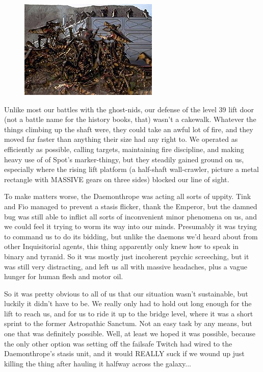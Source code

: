 \begin{figure}
	\begin{center}
		\includegraphics[width=\figwidth]{pics/15/65.png}
	\end{center}
\end{figure}
Unlike most our battles with the ghost-nids, our defense of the level 39 lift door (not a battle name for the history books, that) wasn't a cakewalk. 
Whatever the things climbing up the shaft were, they could take an awful lot of fire, and they moved far faster than anything their size had any right to. 
We operated as efficiently as possible, calling targets, maintaining fire discipline, and making heavy use of of Spot's marker-thingy, but they steadily gained ground on us, especially where the rising lift platform (a half-shaft wall-crawler, picture a metal rectangle with MASSIVE gears on three sides) blocked our line of sight.

To make matters worse, the Daemonthrope was acting all sorts of uppity. 
Tink and Fio managed to prevent a stasis flicker, thank the Emperor, but the damned bug was still able to inflict all sorts of inconvenient minor phenomena on us, and we could feel it trying to worm its way into our minds. 
Presumably it was trying to command us to do its bidding, but unlike the daemons we'd heard about from other Inquisitorial agents, this thing apparently only knew how to speak in binary and tyranid. 
So it was mostly just incoherent psychic screeching, but it was still very distracting, and left us all with massive headaches, plus a vague hunger for human flesh and motor oil.

So it was pretty obvious to all of us that our situation wasn't sustainable, but luckily it didn't have to be. 
We really only had to hold out long enough for the lift to reach us, and for us to ride it up to the bridge level, where it was a short sprint to the former Astropathic Sanctum. 
Not an easy task by any means, but one that was definitely possible. 
Well, at least we hoped it was possible, because the only other option was setting off the failsafe Twitch had wired to the Daemonthrope's stasis unit, and it would REALLY suck if we wound up just killing the thing after hauling it halfway across the galaxy...

